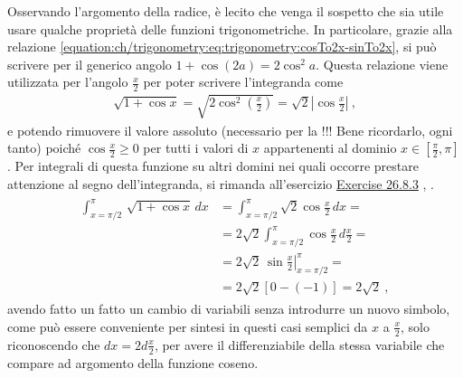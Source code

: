 \documentclass[letterpaper,10pt,italian]{jupyterBook}
\begin{document}
\sphinxAtStartPar
{} Osservando l’argomento della radice, è lecito che venga il sospetto che sia utile usare qualche proprietà delle funzioni trigonometriche. In particolare, grazie alla relazione \eqref{equation:ch/trigonometry:eq:trigonometry:cosTo2x-sinTo2x}, si può scrivere per il generico angolo \(1 + \cos (2a) = 2 \cos^2 a\). Questa relazione viene utilizzata per l’angolo \(\frac{x}{2}\) per poter scrivere l’integranda come
\begin{equation*}
\begin{split}\sqrt{1 + \cos x} = \sqrt{2 \cos^2 \left( \frac{x}{2} \right) } = \sqrt{2} \left|\cos \frac{x}{2} \right| \ ,\end{split}
\end{equation*}
\sphinxAtStartPar
e potendo rimuovere il valore assoluto (necessario per la {\hyperref[\detokenize{ch/algebra/real-algebra:math-hs-algebra-real-root}]{}}!!! Bene ricordarlo, ogni tanto) poiché \(\cos \frac{x}{2} \ge 0\) per tutti i valori di \(x\) appartenenti al dominio \(x \in \left[\frac{\pi}{2}, \pi\right]\). Per integrali di questa funzione su altri domini nei quali occorre prestare attenzione al segno dell’integranda, si rimanda all’esercizio \hyperref[exercise:ex:integrals:definite:attention]{Exercise 26.8.3} , .
\begin{equation*}
\begin{split}\begin{aligned}
   \int_{x=\pi/2}^{\pi} \, \sqrt{1 + \cos x} \, dx 
   & = \int_{x=\pi/2}^{\pi} \sqrt{2} \cos \frac{x}{2} \, dx = \\
   & = 2 \sqrt{2} \int_{x=\pi/2}^{\pi} \cos \frac{x}{2} \, d \frac{x}{2} = \\
   & = 2 \sqrt{2} \left. \, \sin \frac{x}{2} \right|_{x={\pi/2}}^{\pi} = \\
   & = 2 \sqrt{2} \left[ 0 - (-1) \right] = 2 \sqrt{2} \ ,
 \end{aligned}\end{split}
\end{equation*}
\sphinxAtStartPar
avendo fatto un fatto un cambio di variabili \sphinxhyphen{} senza introdurre un nuovo simbolo, come può essere conveniente per sintesi in questi casi semplici \sphinxhyphen{} da \(x\) a \(\frac{x}{2}\), solo riconoscendo che \(dx = 2 d \frac{x}{2}\), per avere il differenziabile della stessa variabile che compare ad argomento della funzione coseno.
\end{document}
